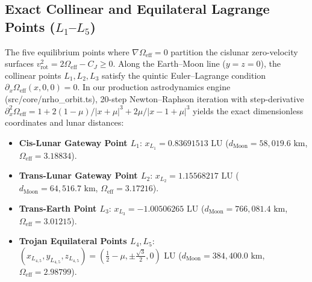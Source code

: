 \documentclass[11pt,a4paper,reqno]{article}
\def\bm#1{#1}%
\def\texttt#1{#1}%
\theoremstyle{plain}
\theoremstyle{definition}
\theoremstyle{remark}
\numberwithin{equation}{section}
\begin{document}
\subsection{Exact Collinear and Equilateral Lagrange Points (\texorpdfstring{$L_1$--$L_5$}{L1--L5})}
The five equilibrium points where $\nabla \Omega_{\text{eff}} = \bm{0}$ partition the cislunar zero-velocity surfaces $v_{\text{rot}}^2 = 2\Omega_{\text{eff}} - C_J \ge 0$. Along the Earth--Moon line ($y = z = 0$), the collinear points $L_1, L_2, L_3$ satisfy the quintic Euler--Lagrange condition $\partial_x \Omega_{\text{eff}}(x, 0, 0) = 0$. In our production astrodynamics engine (\texttt{src/core/nrho\_orbit.ts}), 20-step Newton--Raphson iteration with step-derivative $\partial^2_x \Omega_{\text{eff}} = 1 + 2(1-\mu)/|x+\mu|^3 + 2\mu/|x-1+\mu|^3$ yields the exact dimensionless coordinates and lunar distances:
\begin{itemize}[leftmargin=1.8em,itemsep=2pt]
  \item \textbf{Cis-Lunar Gateway Point $L_1$}: $x_{L_1} = 0.83691513\text{ LU}$ ($d_{\text{Moon}} = 58,019.6\text{ km}$, $\Omega_{\text{eff}} = 3.18834$).
  \item \textbf{Trans-Lunar Gateway Point $L_2$}: $x_{L_2} = 1.15568217\text{ LU}$ ($d_{\text{Moon}} = 64,516.7\text{ km}$, $\Omega_{\text{eff}} = 3.17216$).
  \item \textbf{Trans-Earth Point $L_3$}: $x_{L_3} = -1.00506265\text{ LU}$ ($d_{\text{Moon}} = 766,081.4\text{ km}$, $\Omega_{\text{eff}} = 3.01215$).
  \item \textbf{Trojan Equilateral Points $L_4, L_5$}: $(x_{L_{4,5}}, y_{L_{4,5}}, z_{L_{4,5}}) = (\tfrac{1}{2} - \mu, \pm\tfrac{\sqrt{3}}{2}, 0)\text{ LU}$ ($d_{\text{Moon}} = 384,400.0\text{ km}$, $\Omega_{\text{eff}} = 2.98799$).
\end{itemize}
\end{document}
